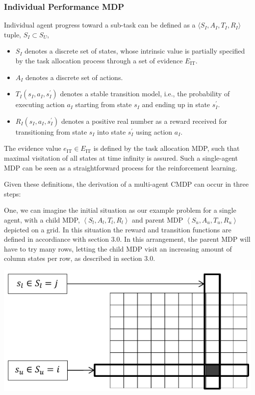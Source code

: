 \documentclass[compsoc,journal,letterpaper,10pt,draftclsnofoot,onecolumn]{IEEEtran}
\begin{document}
\subsubsection{Individual Performance
MDP}\label{individual-performance-mdp}

Individual agent progress toward a sub-task can be defined as a
\( \langle S_{I}, A_{I}, T_{I}, R_{I} \rangle \) tuple, \(S_{I} \subset S_{U}\),

\begin{itemize}
\item
  \(S_{I}\) denotes a discrete set of states, whose intrinsic value is
  partially specified by the task allocation process through a set of
  evidence \(E_{\text{IT}}\).
\item
  \(A_{I}\) denotes a discrete set of actions.
\item
  \(T_{I}\left( s_{I}, a_{I}, s_{I}^{'} \right)\) denotes a stable
  transition model, i.e., the probability of executing action \(a_{I}\)
  starting from state \(s_{I}\) and ending up in state \(s_{I}^{'}\).
\item
  \(R_{I}(s_{I},a_{I},s_{I}^{'})\) denotes a positive real number as a
  reward received for transitioning from state \(s_{I}\) into state
  \(s_{I}^{'}\) using action \(a_{I}\).
\end{itemize}

The evidence value \(e_{\text{IT}} \in E_{\text{IT}}\) is defined by
the task allocation MDP, such that maximal visitation of all states at
time infinity is assured. Such a single-agent MDP can be seen as a
straightforward process for the reinforcement learning.

Given these definitions, the derivation of a multi-agent CMDP can occur
in three steps:

One, we can imagine the initial situation as our example problem for a
single agent, with a child MDP,
\(\left\langle S_{l},A_{l},T_{l},R_{l} \right\rangle\) and parent MDP
\(\left\langle S_{u},A_{u},T_{u},R_{u} \right\rangle\) depicted on a
grid. In this situation the reward and transition functions are defined
in accordiance with section 3.0. In this arrangement, the parent MDP
will have to try many rows, letting the child MDP visit an increasing
amount of column states per row, as described in section 3.0.

 
\includegraphics{media/figure7.pdf}
 
\end{document}
